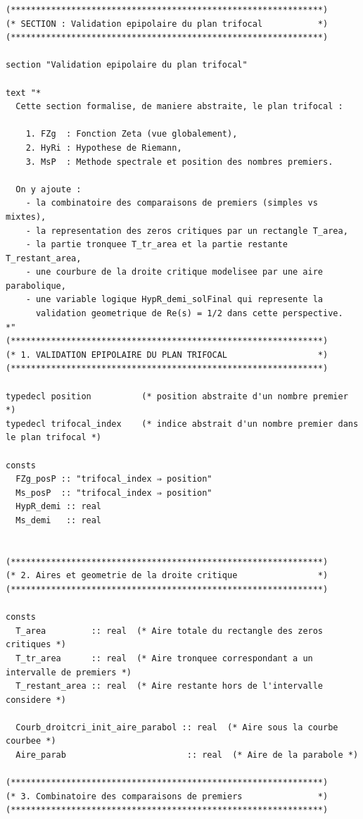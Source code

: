 \documentclass[a4paper,11pt]{article}
\begin{document}
\begin{holcode}[title={\textcolor{white}{File: methode\_spectral.thy -- Part 1/4}}]
\begin{lstlisting}
(**************************************************************)
(* SECTION : Validation epipolaire du plan trifocal           *)
(**************************************************************)

section "Validation epipolaire du plan trifocal"

text "*
  Cette section formalise, de maniere abstraite, le plan trifocal :

    1. FZg  : Fonction Zeta (vue globalement),
    2. HyRi : Hypothese de Riemann,
    3. MsP  : Methode spectrale et position des nombres premiers.

  On y ajoute :
    - la combinatoire des comparaisons de premiers (simples vs mixtes),
    - la representation des zeros critiques par un rectangle T_area,
    - la partie tronquee T_tr_area et la partie restante T_restant_area,
    - une courbure de la droite critique modelisee par une aire parabolique,
    - une variable logique HypR_demi_solFinal qui represente la
      validation geometrique de Re(s) = 1/2 dans cette perspective.
*"
(**************************************************************)
(* 1. VALIDATION EPIPOLAIRE DU PLAN TRIFOCAL                  *)
(**************************************************************)

typedecl position          (* position abstraite d'un nombre premier *)
typedecl trifocal_index    (* indice abstrait d'un nombre premier dans le plan trifocal *)

consts
  FZg_posP :: "trifocal_index ⇒ position"
  Ms_posP  :: "trifocal_index ⇒ position"
  HypR_demi :: real
  Ms_demi   :: real


(**************************************************************)
(* 2. Aires et geometrie de la droite critique                *)
(**************************************************************)

consts
  T_area         :: real  (* Aire totale du rectangle des zeros critiques *)
  T_tr_area      :: real  (* Aire tronquee correspondant a un intervalle de premiers *)
  T_restant_area :: real  (* Aire restante hors de l'intervalle considere *)

  Courb_droitcri_init_aire_parabol :: real  (* Aire sous la courbe courbee *)
  Aire_parab                        :: real  (* Aire de la parabole *)

(**************************************************************)
(* 3. Combinatoire des comparaisons de premiers               *)
(**************************************************************)


\end{lstlisting}
\end{holcode}
\end{document}
